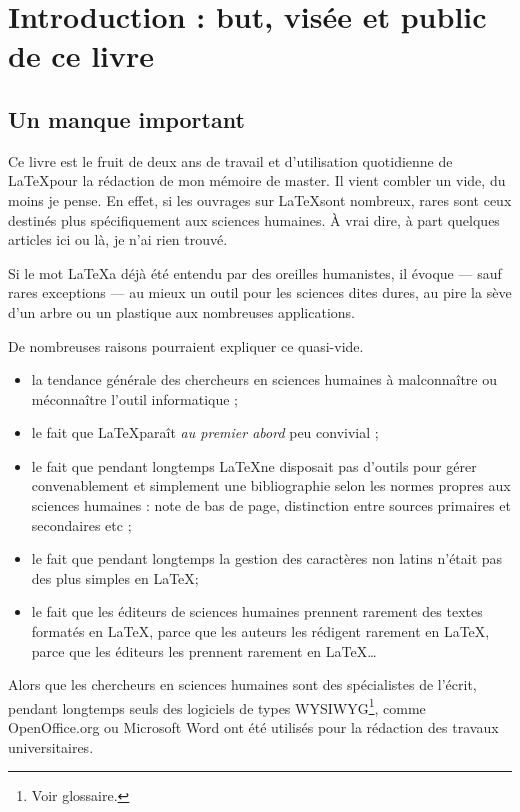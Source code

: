 \chapter{Introduction : but, visée et public de ce livre}
\section{Un manque important}

Ce livre est le fruit de deux ans de travail et d'utilisation quotidienne de \LaTeX pour la rédaction de mon mémoire de master. Il vient combler un vide, du moins je pense. En effet, si les ouvrages sur \LaTeX sont nombreux, rares sont ceux destinés plus spécifiquement aux sciences humaines. À vrai dire, à part quelques articles ici ou là, je n'ai rien trouvé.


Si le mot \LaTeX a déjà été entendu par des oreilles humanistes, il évoque --- sauf rares exceptions --- au mieux un outil pour les sciences dites dures, au pire la sève d'un arbre ou un plastique aux nombreuses applications. 

De nombreuses raisons pourraient expliquer ce quasi-vide.
\begin{itemize}
\item la tendance générale des chercheurs en sciences humaines à malconnaître ou méconnaître l'outil informatique ;
\item le fait que \LaTeX paraît \emph{au premier abord} peu convivial ;
\item le fait que pendant longtemps \LaTeX ne disposait pas d'outils pour gérer convenablement et simplement une bibliographie selon les normes propres aux sciences humaines : note de bas de page, distinction entre sources primaires et secondaires etc ;
\item le fait que pendant longtemps la gestion des caractères non latins n'était pas des plus simples en \LaTeX ;
\item le fait que les éditeurs de sciences humaines prennent rarement des textes formatés en \LaTeX, parce que les auteurs les rédigent rarement en \LaTeX, parce que les éditeurs les prennent rarement en \LaTeX \ldots
\end{itemize}

Alors que les chercheurs en sciences humaines sont des spécialistes de l'écrit, pendant longtemps seuls des logiciels de types WYSIWYG\footnote{Voir glossaire.}, comme OpenOffice.org ou Microsoft Word ont été utilisés pour la rédaction des travaux universitaires.

